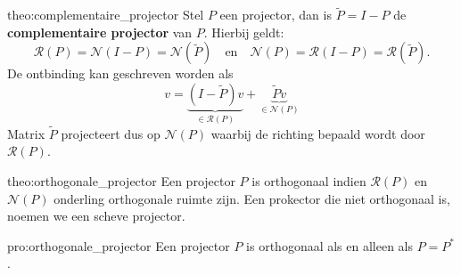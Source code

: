 \begin{theo}{theo:complementaire_projector}
    Stel $P$ een projector, dan is $\tilde{P} = I - P$ de \textbf{complementaire projector} van $P$. Hierbij geldt:
    \begin{equation*}
        \mathcal{R}(P) = \mathcal{N}(I-P) = \mathcal{N}(\tilde{P})  \quad \text{en} \quad \mathcal{N}(P) = \mathcal{R}(I-P) = \mathcal{R}(\tilde{P}).
    \end{equation*}
    De ontbinding kan geschreven worden als 
    \begin{equation*}
        v = \underbrace{(I - \tilde{P})v}_{\in \mathcal{R}(P)} + \underbrace{\tilde{P}v}_{\in \mathcal{N}(P)}
    \end{equation*}
    Matrix $\tilde{P}$ projecteert dus op $\mathcal{N}(P)$ waarbij de richting bepaald wordt door $\mathcal{R}(P)$.
\end{theo}

\begin{theo}{theo:orthogonale_projector}
    Een projector $P$ is orthogonaal indien $\mathcal{R}(P)$ en $\mathcal{N}(P)$ onderling orthogonale ruimte zijn. Een prokector die niet orthogonaal is, noemen we een scheve projector.
\end{theo}

\begin{pro}{pro:orthogonale_projector}
    Een projector $P$ is orthogonaal als en alleen als $P = P^*$.
\end{pro}


